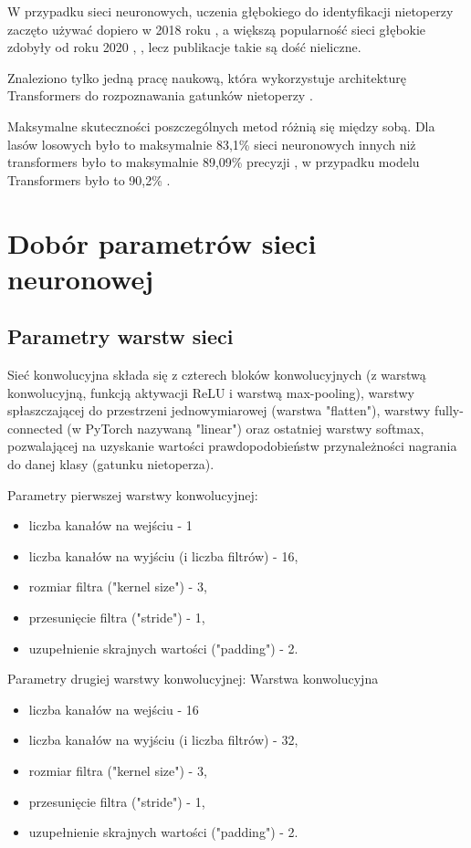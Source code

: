 \documentclass{sprz}
\begin{document}
W przypadku sieci neuronowych, uczenia głębokiego do identyfikacji nietoperzy zaczęto używać dopiero w 2018 roku \cite{bats-id-dl2018}, a większą popularność sieci głębokie zdobyły od roku 2020 \cite{bats-id-dl2020a}, \cite{bats-id-dl2020b}, lecz publikacje takie są dość nieliczne.

Znaleziono tylko jedną pracę naukową, która wykorzystuje architekturę Transformers do rozpoznawania gatunków nietoperzy \cite{bats-transformers}.

Maksymalne skuteczności poszczególnych metod różnią się między sobą. Dla lasów losowych było to maksymalnie 83,1\% \cite{bats-id-randomforest} sieci neuronowych innych niż transformers było to maksymalnie 89,09\% precyzji \cite{bats-id-dl}, w przypadku modelu Transformers było to 90,2\% \cite{bats-transformers}.

\section{Dobór parametrów sieci neuronowej}

\subsection{Parametry warstw sieci}
Sieć konwolucyjna składa się z czterech bloków konwolucyjnych (z warstwą konwolucyjną, funkcją aktywacji ReLU i warstwą max-pooling), warstwy spłaszczającej do przestrzeni jednowymiarowej (warstwa "flatten"), warstwy fully-connected (w PyTorch nazywaną "linear") oraz ostatniej warstwy softmax, pozwalającej na uzyskanie wartości prawdopodobieństw przynależności nagrania do danej klasy (gatunku nietoperza).

Parametry pierwszej warstwy konwolucyjnej:
\begin{itemize}
  \item{liczba kanałów na wejściu - 1}
  \item{liczba kanałów na wyjściu (i liczba filtrów) - 16,}
  \item{rozmiar filtra ("kernel size") - 3,}
  \item {przesunięcie filtra ("stride") - 1,}
  \item{uzupełnienie skrajnych wartości ("padding") - 2.}
\end{itemize}

Parametry drugiej warstwy konwolucyjnej:
Warstwa konwolucyjna
\begin{itemize}
  \item{liczba kanałów na wejściu - 16}
  \item{liczba kanałów na wyjściu (i liczba filtrów) - 32,}
  \item{rozmiar filtra ("kernel size") - 3,}
  \item {przesunięcie filtra ("stride") - 1,}
  \item{uzupełnienie skrajnych wartości ("padding") - 2.}
\end{itemize}
\end{document}
